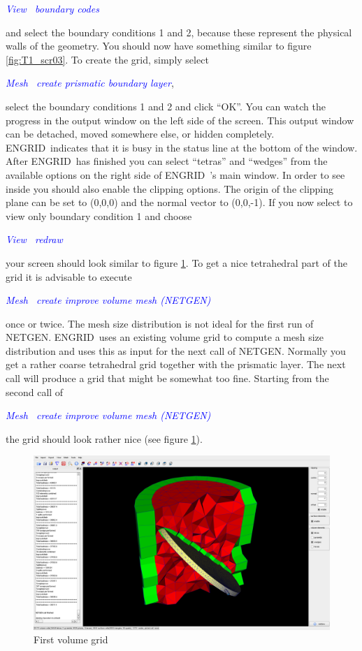 \documentclass[10pt,a4paper,british]{book}
\newcommand\eg{ENGRID\ }
\newcommand\arr{\guillemotright\ }
\newcommand\menu[1]{\textcolor{blue}{\it \hspace{5mm} #1}}
\begin{document}
\menu{View \arr boundary codes}
 
and select the boundary conditions 1 and 2, because these represent the physical walls of the geometry. You should now have something similar to figure \ref{fig:T1_scr03}. To create the grid, simply select

\menu{Mesh \arr create prismatic boundary layer}, 

select the boundary conditions 1 and 2 and click {}``OK''. You can watch the progress in the output window on the left side of the screen. This output window can be detached, moved somewhere else, or hidden completely. \eg indicates that it is busy in the status line at the bottom of the window. After \eg has finished you can select {}``tetras'' and {}``wedges'' from
the available options on the right side of \eg's main window. In order to see inside you should also enable the clipping options. The origin of the clipping plane can be set to (0,0,0) and the normal vector to (0,0,-1). If you now select to view only boundary condition 1 and choose

\menu{View \arr redraw}
 
your screen should look similar to figure \ref{fig:T1_scr04}. To get a nice tetrahedral part of the grid it is advisable to execute

\menu{Mesh \arr create improve volume mesh (NETGEN)}

once or twice. The mesh size distribution is not ideal for the first run of NETGEN. \eg uses an existing volume grid to compute a mesh size distribution and uses this as input for the next call of NETGEN. Normally you get a rather coarse tetrahedral grid together with the prismatic layer. The next call will produce a grid that might be somewhat too fine. Starting from the second call of

\menu{Mesh \arr create improve volume mesh (NETGEN)}
 
the grid should look rather nice (see figure \ref{fig:T1_scr04}).

\begin{figure}
  \begin{centering}
    \includegraphics[width=14cm]{figures/tutorials/T1/scr04}
    \par
  \end{centering}
  \caption{First volume grid}
  \label{fig:T1_scr04}
\end{figure}
\end{document}
